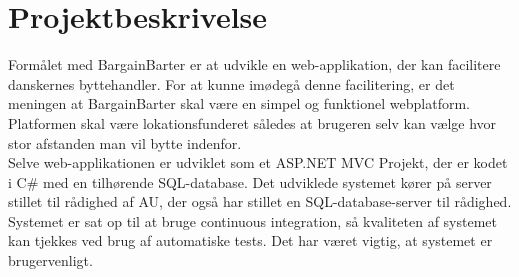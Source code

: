 \chapter{Projektbeskrivelse}\label{ch:Projektbeskrivelse}
Formålet med BargainBarter er at udvikle en web-applikation, der kan facilitere danskernes byttehandler.  For at kunne imødegå denne facilitering, er det meningen at BargainBarter skal være en simpel og funktionel webplatform. Platformen skal være lokationsfunderet således at brugeren selv kan vælge hvor stor afstanden man vil bytte indenfor. 
\\ Selve web-applikationen er udviklet som et ASP.NET MVC Projekt, der er kodet i C\# med en tilhørende SQL-database.
Det udviklede systemet kører på server stillet til rådighed af AU, der også har stillet en SQL-database-server til rådighed. 
Systemet er sat op til at bruge continuous integration, så kvaliteten af systemet kan tjekkes ved brug af automatiske tests. Det har været vigtig, at  systemet er  brugervenligt. 



